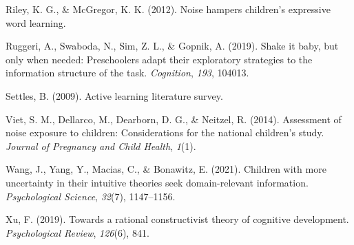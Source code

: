 \documentclass[10pt, letterpaper]{article}
\newenvironment{CSLReferences}%
  {}%
  {\par}
\begin{document}
\begin{CSLReferences}{1}{0}
\leavevmode\hypertarget{ref-riley2012}{}%
Riley, K. G., \& McGregor, K. K. (2012). Noise hampers children's
expressive word learning.

\leavevmode\hypertarget{ref-ruggeri2019}{}%
Ruggeri, A., Swaboda, N., Sim, Z. L., \& Gopnik, A. (2019). Shake it
baby, but only when needed: Preschoolers adapt their exploratory
strategies to the information structure of the task. \emph{Cognition},
\emph{193}, 104013.

\leavevmode\hypertarget{ref-settles2009}{}%
Settles, B. (2009). Active learning literature survey.

\leavevmode\hypertarget{ref-viet2014}{}%
Viet, S. M., Dellarco, M., Dearborn, D. G., \& Neitzel, R. (2014).
Assessment of noise exposure to children: Considerations for the
national children's study. \emph{Journal of Pregnancy and Child Health},
\emph{1}(1).

\leavevmode\hypertarget{ref-wang2021}{}%
Wang, J., Yang, Y., Macias, C., \& Bonawitz, E. (2021). Children with
more uncertainty in their intuitive theories seek domain-relevant
information. \emph{Psychological Science}, \emph{32}(7), 1147--1156.

\leavevmode\hypertarget{ref-xu2019}{}%
Xu, F. (2019). Towards a rational constructivist theory of cognitive
development. \emph{Psychological Review}, \emph{126}(6), 841.

\end{CSLReferences}


\end{document}
